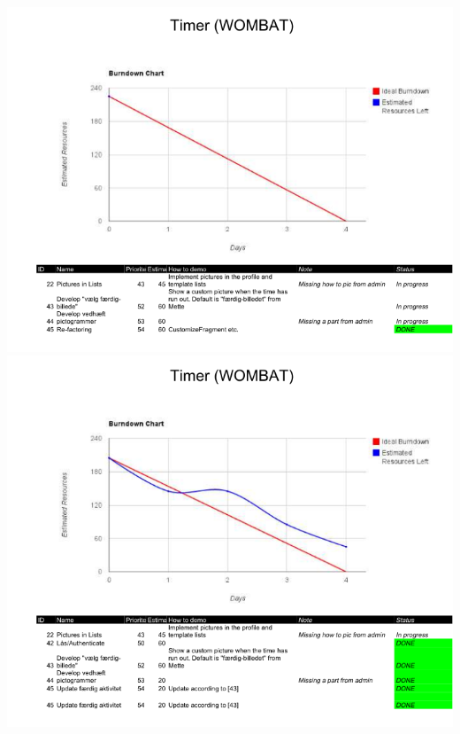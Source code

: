 \begin{center}
		\includegraphics[width=\textwidth]{Development/burndown_charts/Sprint_5.png}
		\includegraphics[width=\textwidth]{Development/burndown_charts/Sprint_6.png}
	\end{center}
	
